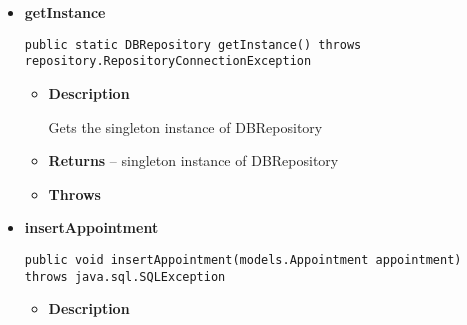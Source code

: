 {{{{\begin{itemize}
{\begin{itemize}
{Gets all groups from the database
}
\item{{\bf  Returns} -- 
A list of all groups 
}%
\item{{\bf  Throws}
}%
\end{itemize}
}%
\item{ 
\hypertarget{repository.DBRepository.getInstance()}{{\bf  getInstance}\\}
\begin{lstlisting}[frame=none]
public static DBRepository getInstance() throws repository.RepositoryConnectionException\end{lstlisting} %
\begin{itemize}
\item{
{\bf  Description}

Gets the singleton instance of DBRepository
}
\item{{\bf  Returns} -- 
singleton instance of DBRepository 
}%
\item{{\bf  Throws}
}%
\end{itemize}
}%
\item{ 
\hypertarget{repository.DBRepository.insertAppointment(models.Appointment)}{{\bf  insertAppointment}\\}
\begin{lstlisting}[frame=none]
public void insertAppointment(models.Appointment appointment) throws java.sql.SQLException\end{lstlisting} %
\begin{itemize}
\item{
{\bf  Description}

}
\end{itemize}}
\end{itemize}}}}}
